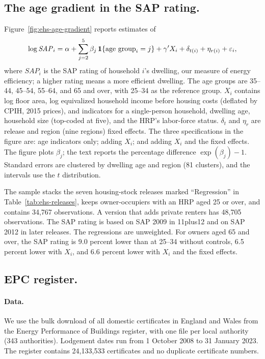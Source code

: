 \subsection{The age gradient in the SAP rating.}\label{app:data-regression}

Figure~\ref{fig:ehs-age-gradient} reports estimates of
\begin{equation}\label{eq:ehs-age-gradient}
  \log \mathit{SAP}_i = \alpha + \sum_{j=2}^{5}\beta_j\,
  \mathbf 1\{\text{age group}_i = j\} + \gamma' X_i + \delta_{t(i)} + \eta_{r(i)}
  + \varepsilon_i,
\end{equation}
where $\mathit{SAP}_i$ is the SAP rating of household $i$'s dwelling, our
measure of energy efficiency; a higher rating means a more efficient
dwelling. The age groups are
35--44, 45--54, 55--64, and 65 and over, with 25--34 as the reference group.
$X_i$ contains log floor area, log equivalized household income before
housing costs (deflated by CPIH, 2015 prices), and indicators for a
single-person household, dwelling age, household size (top-coded at five),
and the HRP's labor-force status. $\delta_t$ and $\eta_r$ are release and
region (nine regions) fixed effects. The three specifications in the figure
are: age indicators only; adding $X_i$; and adding $X_i$ and the fixed
effects. The figure plots $\beta_j$; the text reports the percentage
difference $\exp(\beta_j)-1$. Standard errors are clustered
by dwelling age and region (81 clusters), and the intervals use the $t$
distribution.

The sample stacks the seven housing-stock releases marked ``Regression'' in
Table~\ref{tab:ehs-releases}, keeps owner-occupiers with an HRP aged 25 or
over, and contains 34,767 observations. A version that adds private renters
has 48,705 observations. The SAP rating is based on SAP 2009 in 11plus12 and
on SAP 2012 in later releases. The regressions are unweighted. For owners
aged 65 and over, the SAP rating is 9.0 percent lower than at 25--34 without
controls, 6.5 percent lower with $X_i$, and 6.6 percent lower with $X_i$ and
the fixed effects.

\subsection{EPC register.}\label{app:data-epc}

\paragraph{Data.} We use the bulk download of all domestic certificates in
England and Wales from the Energy Performance of Buildings register, with one
file per local authority (343 authorities). Lodgement dates run from 1
October 2008 to 31 January 2023. The register contains 24,133,533
certificates and no duplicate certificate numbers.

